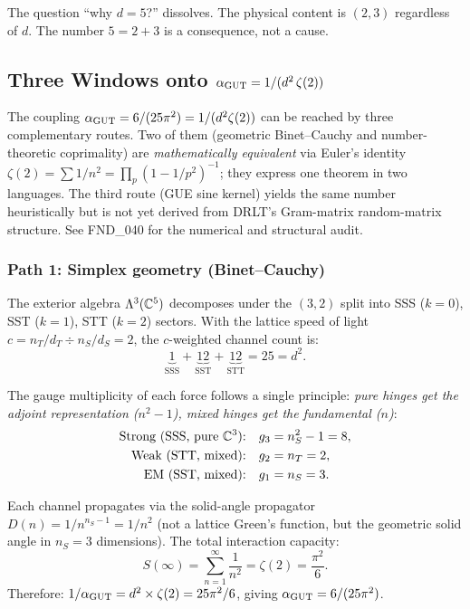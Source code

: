 \begin{corollary}
The question ``why $d = 5$?'' dissolves. The physical content is $(2, 3)$ regardless of $d$. The number $5 = 2 + 3$ is a consequence, not a cause.
\end{corollary}

\subsection{Three Windows onto $\alpha_{\mathrm{GUT}} = 1/(d^2\,\zeta(2))$}

The coupling $\alpha_{\mathrm{GUT}} = 6/(25\pi^2) = 1/(d^2 \zeta(2))$ can be reached by three complementary routes.  Two of them (geometric Binet--Cauchy and number-theoretic coprimality) are \emph{mathematically equivalent} via Euler's identity $\zeta(2) = \sum 1/n^2 = \prod_p (1 - 1/p^2)^{-1}$; they express one theorem in two languages.  The third route (GUE sine kernel) yields the same number heuristically but is not yet derived from DRLT's Gram-matrix random-matrix structure.  See FND\_040 for the numerical and structural audit.

\subsubsection{Path 1: Simplex geometry (Binet--Cauchy)}

The exterior algebra $\Lambda^3(\mathbb{C}^5)$ decomposes under the $(3,2)$ split into SSS ($k=0$), SST ($k=1$), STT ($k=2$) sectors. With the lattice speed of light $c = n_T/d_T \div n_S/d_S = 2$, the $c$-weighted channel count is:
\begin{equation}
\underbrace{1}_{\text{SSS}} + \underbrace{12}_{\text{SST}} + \underbrace{12}_{\text{STT}} = 25 = d^2.
\end{equation}

The gauge multiplicity of each force follows a single principle: \emph{pure hinges get the adjoint representation ($n^2-1$), mixed hinges get the fundamental ($n$)}:
\begin{align}
\text{Strong (SSS, pure } \mathbb{C}^3\text{):} \quad g_3 &= n_S^2 - 1 = 8, \\
\text{Weak (STT, mixed):} \quad g_2 &= n_T = 2, \\
\text{EM (SST, mixed):} \quad g_1 &= n_S = 3.
\end{align}

Each channel propagates via the solid-angle propagator $D(n) = 1/n^{n_S-1} = 1/n^2$ (not a lattice Green's function, but the geometric solid angle in $n_S = 3$ dimensions). The total interaction capacity:
\begin{equation}
S(\infty) = \sum_{n=1}^{\infty} \frac{1}{n^2} = \zeta(2) = \frac{\pi^2}{6}.
\end{equation}
Therefore: $1/\alpha_{\mathrm{GUT}} = d^2 \times \zeta(2) = 25\pi^2/6$, giving $\alpha_{\mathrm{GUT}} = 6/(25\pi^2)$.

